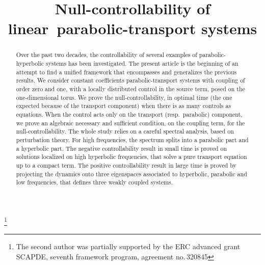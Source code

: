 \documentclass[JEP,XML,SOM,Unicode,NoEqCountersInSection]{cedram}
\theoremstyle{plain}
\theoremstyle{definition}
\theoremstyle{remark}
\begin{document}
\title{Null-controllability of linear~parabolic-transport systems}

\author[\initial{K.} \lastname{Beauchard}]{ }
\address{Univ Rennes, CNRS, IRMAR - UMR 6625\\
F-35000 Rennes, France}

\author[\initial{A.} \lastname{Koenig}]{ }
\address{Université Côte d'Azur, CNRS, LJAD, France}

\author[\initial{K.} \lastname{Le Balc'h}]{ }
\address{Univ Rennes, CNRS, IRMAR - UMR 6625\\
F-35000 Rennes, France}

\thanks{The second author was partially supported by the ERC advanced grant SCAPDE, seventh framework program, agreement no.\,320845}

\begin{abstract}
Over the past two decades, the controllability of several examples of parabolic-hyperbolic systems has been investigated. The present article is the beginning of an attempt to find a unified framework that encompasses and generalizes the previous results.
We consider constant coefficients parabolic-transport systems with coupling of order zero and one, with a locally distributed control in the source term, posed on the one-dimensional torus.
We prove the null-controllability, in optimal time (the one expected because of the transport component) when there is as many controls as equations. When the control acts only on the transport (resp.\ parabolic) component, we prove an algebraic necessary and sufficient condition, on the coupling term, for the null-controllability.
The whole study relies on a careful spectral analysis, based on perturbation theory. For high frequencies, the spectrum splits into a parabolic part and a hyperbolic part. The negative controllability result in small time is proved on solutions localized on high hyperbolic frequencies, that solve a pure transport equation up to a compact term. The positive controllability result in large time is proved by projecting the dynamics onto three eigenspaces associated to hyperbolic, parabolic and low frequencies, that defines three weakly coupled systems.
\end{abstract}
\end{document}
